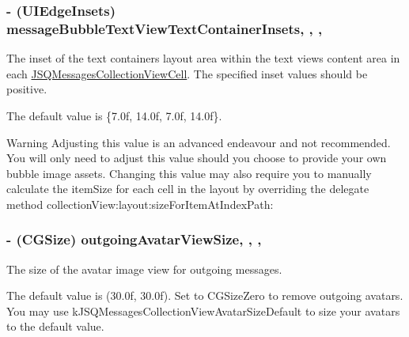 \subsubsection[{message\+Bubble\+Text\+View\+Text\+Container\+Insets}]{\setlength{\rightskip}{0pt plus 5cm}-\/ (U\+I\+Edge\+Insets) message\+Bubble\+Text\+View\+Text\+Container\+Insets\hspace{0.3cm}{\ttfamily [read]}, {\ttfamily [write]}, {\ttfamily [nonatomic]}, {\ttfamily [assign]}}\label{interface_j_s_q_messages_collection_view_flow_layout_a2a696c1e239c9d8ec6f85fb4e298a33b}
The inset of the text container\textquotesingle{}s layout area within the text view\textquotesingle{}s content area in each {\ttfamily \hyperlink{interface_j_s_q_messages_collection_view_cell}{J\+S\+Q\+Messages\+Collection\+View\+Cell}}. The specified inset values should be positive.

The default value is {\ttfamily \{7.\+0f, 14.\+0f, 7.\+0f, 14.\+0f\}}.

\begin{DoxyWarning}{Warning}
Adjusting this value is an advanced endeavour and not recommended. You will only need to adjust this value should you choose to provide your own bubble image assets. Changing this value may also require you to manually calculate the item\+Size for each cell in the layout by overriding the delegate method {\ttfamily collection\+View\+:layout\+:size\+For\+Item\+At\+Index\+Path\+:} 
\end{DoxyWarning}
\hypertarget{interface_j_s_q_messages_collection_view_flow_layout_a01d91d9850fb667deefa69bbbbb58a03}{}
\subsubsection[{outgoing\+Avatar\+View\+Size}]{\setlength{\rightskip}{0pt plus 5cm}-\/ (C\+G\+Size) outgoing\+Avatar\+View\+Size\hspace{0.3cm}{\ttfamily [read]}, {\ttfamily [write]}, {\ttfamily [nonatomic]}, {\ttfamily [assign]}}\label{interface_j_s_q_messages_collection_view_flow_layout_a01d91d9850fb667deefa69bbbbb58a03}
The size of the avatar image view for outgoing messages.

The default value is {\ttfamily (30.\+0f, 30.\+0f)}. Set to {\ttfamily C\+G\+Size\+Zero} to remove outgoing avatars. You may use {\ttfamily k\+J\+S\+Q\+Messages\+Collection\+View\+Avatar\+Size\+Default} to size your avatars to the default value. \hypertarget{interface_j_s_q_messages_collection_view_flow_layout_aff25c7d92997659fd770b22b2ad6ce69}{}
